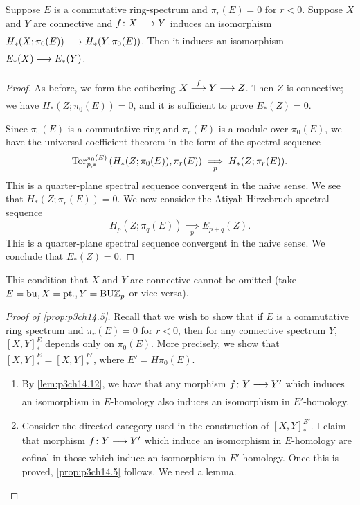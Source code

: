 \documentclass[../main]{subfiles}
\begin{document}
\begin{lemma} \label{lem:p3ch14.13}
Suppose $E$ is a commutative ring-spectrum and $ \pi_{r}(E)=0$ for $r<0$. Suppose $X$ and $Y$ are connective and $f\colon  X \lar{}  Y $ induces an isomorphism $H_{\ast}(X;\pi_{0}(E)) \lar{} H_{\ast}(Y, \pi_{0}(E))$. Then it induces an isomorphism $E_{\ast}(X) \lar{} E_{\ast}(Y)$.

\begin{proof} 
  As before, we form the cofibering $X \vra{f} Y \lar{} Z$. Then $Z$ is connective; we have $H_{\ast}(Z;\pi_{0}(E))=0$, and it is sufficient to prove $E_{\ast}(Z)=0$.

  Since $ \pi_{0}(E)$ is a commutative ring and $ \pi_{r}(E)$ is a module over $ \pi_{0}(E)$, we have the universal coefficient theorem in the form of the spectral sequence
  \[
  \mathrm{Tor}_{p,\ast}^{\pi_{0}(E)} \left(H_{\ast}(Z;\pi_{0}(E)),\pi_{r}(E)\right) \underset{p}{\implies} H_{\ast}(Z;\pi_{r}(E)).
  \] 
  This is a quarter-plane spectral sequence convergent in the naive sense. We see that $H_{\ast}(Z;\pi_{r}(E))=0$. We now consider the Atiyah-Hirzebruch spectral sequence
  \[
    H_{p}(Z;\pi_{q}(E)) \underset{p}{\implies} E_{p+q} (Z). 
  \] 
  This is a quarter-plane spectral sequence convergent in the naive sense. We conclude that $E_{\ast}(Z)=0$.
\end{proof}
\begin{warning}
This condition that $X$ and $Y$ are connective cannot be omitted (take $E = \mathrm{bu}, X=\mathrm{pt.}, Y=\mathrm{BU}\mathbb{Z}_p$ or vice versa).
\end{warning} 
\end{lemma}

\begin{proof}[Proof of \ref{prop:p3ch14.5}] 
  Recall that we wish to show that if $E$ is a commutative ring spectrum and $\pi_{r}(E)=0$ for $r<0$, then for any connective spectrum $Y$, $\left[X,Y\right]^E_{\ast}$ depends only on $\pi_{0}(E)$. More precisely, we show that $\left[X,Y\right]^E_{\ast}=\left[X,Y\right]^{E'}_{\ast}$, where $E'=H\pi_{0}(E)$.
  \begin{enumerate} 
    \item [(i)] By \ref{lem:p3ch14.12}, we have that any morphism $f\colon  Y \lar{}  Y' $ which induces an isomorphism in $E$-homology also induces an isomorphism in $E'$-homology.
    \item [(ii)] Consider the directed category used in the construction of $\left[X,Y\right]^{E'}_{\ast}$. I claim that morphism $f\colon  Y \lar{}  Y' $ which induce an isomorphism in $E$-homology are cofinal in those which induce an isomorphism in $E'$-homology. Once this is proved, \ref{prop:p3ch14.5} follows. We need a lemma.
  \end{enumerate}
\end{proof}
\end{document}
